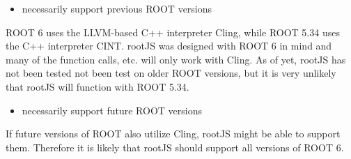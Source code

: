 \begin{itemize}
	\item necessarily support previous ROOT versions
\end{itemize}
ROOT 6 uses the LLVM-based C++ interpreter Cling, while ROOT 5.34 uses the C++ interpreter CINT. 
rootJS was designed with ROOT 6 in mind and many of the function calls, etc. will only work with Cling. 
As of yet, rootJS has not been tested not been test on older ROOT versions, but it is very unlikely that rootJS will function with ROOT 5.34.

\begin{itemize}
	\item necessarily support future ROOT versions
\end{itemize}
If future versions of ROOT also utilize Cling, rootJS might be able to support them. Therefore it is likely that rootJS should support all versions of ROOT 6.
